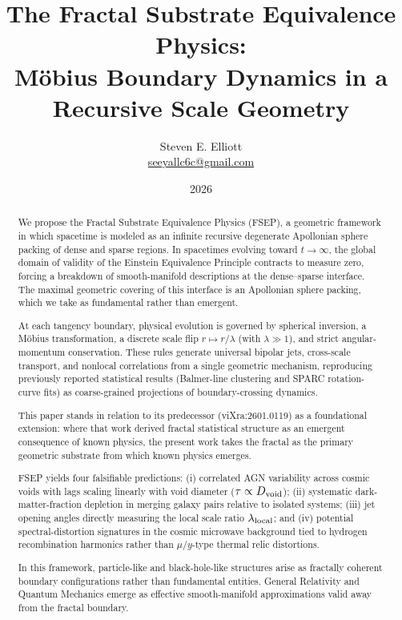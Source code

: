 \documentclass[11pt,letterpaper]{article}
\title{\textbf{The Fractal Substrate Equivalence Physics:}\\[0.5em]
\large M\"obius Boundary Dynamics in a Recursive Scale Geometry\\[0.2em]}
\author{Steven E. Elliott\\
\small \href{mailto:seeyallc6c@gmail.com}{seeyallc6c@gmail.com}}
\date{2026}
\begin{document}
\maketitle
\pagestyle{plain}

\begin{abstract}
We propose the Fractal Substrate Equivalence Physics (FSEP), a geometric framework
in which spacetime is modeled as an infinite recursive degenerate Apollonian sphere
packing of dense and sparse regions. In spacetimes evolving toward $t \to \infty$,
the global domain of validity of the Einstein Equivalence Principle contracts to
measure zero, forcing a breakdown of smooth-manifold descriptions at the
dense--sparse interface. The maximal geometric covering of this interface is an
Apollonian sphere packing, which we take as fundamental rather than emergent.

At each tangency boundary, physical evolution is governed by spherical inversion,
a M\"obius transformation, a discrete scale flip $r \mapsto r/\lambda$ (with
$\lambda \gg 1$), and strict angular-momentum conservation. These rules generate
universal bipolar jets, cross-scale transport, and nonlocal correlations from a
single geometric mechanism, reproducing previously reported statistical results
(Balmer-line clustering and SPARC rotation-curve fits) as coarse-grained
projections of boundary-crossing dynamics.

This paper stands in relation to its predecessor (viXra:2601.0119) as a
foundational extension: where that work derived fractal statistical structure as an
emergent consequence of known physics, the present work takes the fractal as the
primary geometric substrate from which known physics emerges.

FSEP yields four falsifiable predictions: (i) correlated AGN variability across
cosmic voids with lags scaling linearly with void diameter ($\tau \propto
D_{\rm void}$); (ii) systematic dark-matter-fraction depletion in merging galaxy
pairs relative to isolated systems; (iii) jet opening angles directly measuring the
local scale ratio $\lambda_{\rm local}$; and (iv) potential spectral-distortion
signatures in the cosmic microwave background tied to hydrogen recombination
harmonics rather than $\mu$/$y$-type thermal relic distortions.

In this framework, particle-like and black-hole-like structures arise as fractally
coherent boundary configurations rather than fundamental entities. General
Relativity and Quantum Mechanics emerge as effective smooth-manifold approximations
valid away from the fractal boundary.
\end{abstract}
\end{document}
